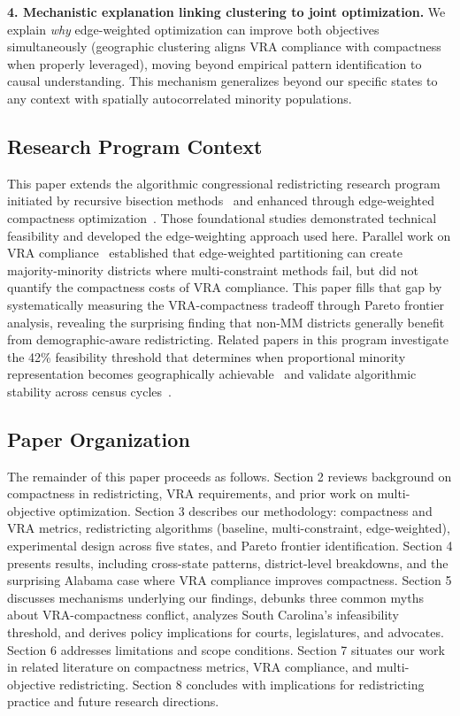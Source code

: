 \textbf{4. Mechanistic explanation linking clustering to joint optimization.} We explain \emph{why} edge-weighted optimization can improve both objectives simultaneously (geographic clustering aligns VRA compliance with compactness when properly leveraged), moving beyond empirical pattern identification to causal understanding. This mechanism generalizes beyond our specific states to any context with spatially autocorrelated minority populations.

\subsection{Research Program Context}

This paper extends the algorithmic congressional redistricting research program initiated by recursive bisection methods~\cite{della-libera-recursive-bisection} and enhanced through edge-weighted compactness optimization~\cite{della-libera-edge-weighted}. Those foundational studies demonstrated technical feasibility and developed the edge-weighting approach used here. Parallel work on VRA compliance~\cite{della-libera-vra-compliance} established that edge-weighted partitioning can create majority-minority districts where multi-constraint methods fail, but did not quantify the compactness costs of VRA compliance. This paper fills that gap by systematically measuring the VRA-compactness tradeoff through Pareto frontier analysis, revealing the surprising finding that non-MM districts generally benefit from demographic-aware redistricting. Related papers in this program investigate the 42\% feasibility threshold that determines when proportional minority representation becomes geographically achievable~\cite{della-libera-threshold-analysis} and validate algorithmic stability across census cycles~\cite{della-libera-cross-census-validation}.

\subsection{Paper Organization}

The remainder of this paper proceeds as follows. Section 2 reviews background on compactness in redistricting, VRA requirements, and prior work on multi-objective optimization. Section 3 describes our methodology: compactness and VRA metrics, redistricting algorithms (baseline, multi-constraint, edge-weighted), experimental design across five states, and Pareto frontier identification. Section 4 presents results, including cross-state patterns, district-level breakdowns, and the surprising Alabama case where VRA compliance improves compactness. Section 5 discusses mechanisms underlying our findings, debunks three common myths about VRA-compactness conflict, analyzes South Carolina's infeasibility threshold, and derives policy implications for courts, legislatures, and advocates. Section 6 addresses limitations and scope conditions. Section 7 situates our work in related literature on compactness metrics, VRA compliance, and multi-objective redistricting. Section 8 concludes with implications for redistricting practice and future research directions.

